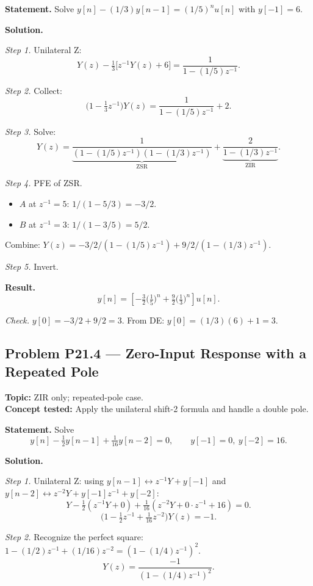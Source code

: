\documentclass[11pt]{article}
\begin{document}
\textbf{Statement.} Solve $y[n]-(1/3)y[n-1] = (1/5)^{n}u[n]$ with $y[-1]=6$.

\textbf{Solution.}

\textit{Step 1.} Unilateral Z:
\[
Y(z) - \tfrac{1}{3}\bigl[z^{-1}Y(z)+6\bigr] = \frac{1}{1-(1/5)z^{-1}}.
\]

\textit{Step 2.} Collect:
\[
\bigl(1-\tfrac{1}{3}z^{-1}\bigr)Y(z) = \frac{1}{1-(1/5)z^{-1}} + 2.
\]

\textit{Step 3.} Solve:
\[
Y(z) = \underbrace{\frac{1}{(1-(1/5)z^{-1})(1-(1/3)z^{-1})}}_{\text{ZSR}}
+\underbrace{\frac{2}{1-(1/3)z^{-1}}}_{\text{ZIR}}.
\]

\textit{Step 4.} PFE of ZSR.
\begin{itemize}
\item $A$ at $z^{-1}=5$: $1/(1-5/3) = -3/2$.
\item $B$ at $z^{-1}=3$: $1/(1-3/5) = 5/2$.
\end{itemize}
Combine: $Y(z) = -3/2/(1-(1/5)z^{-1}) + 9/2/(1-(1/3)z^{-1})$.

\textit{Step 5.} Invert.

\textbf{Result.}
\[
\boxed{\,y[n] = \left[-\tfrac{3}{2}\bigl(\tfrac{1}{5}\bigr)^{n}+\tfrac{9}{2}\bigl(\tfrac{1}{3}\bigr)^{n}\right]u[n].\,}
\]

\textit{Check.} $y[0] = -3/2+9/2 = 3$. From DE: $y[0] = (1/3)(6)+1 = 3$. \checkmark

\subsection{Problem P21.4 --- Zero-Input Response with a Repeated Pole}
\textbf{Topic:} ZIR only; repeated-pole case.\\
\textbf{Concept tested:} Apply the unilateral shift-2 formula and handle a double pole.

\textbf{Statement.} Solve
\[
y[n]-\tfrac{1}{2}y[n-1]+\tfrac{1}{16}y[n-2] = 0,\qquad y[-1]=0,\ y[-2]=16.
\]

\textbf{Solution.}

\textit{Step 1.} Unilateral Z: using
$y[n-1]\leftrightarrow z^{-1}Y+y[-1]$ and
$y[n-2]\leftrightarrow z^{-2}Y+y[-1]z^{-1}+y[-2]$:
\[
Y-\tfrac{1}{2}(z^{-1}Y+0)+\tfrac{1}{16}(z^{-2}Y+0\cdot z^{-1}+16) = 0.
\]
\[
\bigl(1-\tfrac{1}{2}z^{-1}+\tfrac{1}{16}z^{-2}\bigr)Y(z) = -1.
\]

\textit{Step 2.} Recognize the perfect square:
$1-(1/2)z^{-1}+(1/16)z^{-2} = (1-(1/4)z^{-1})^{2}$.
\[
Y(z) = \frac{-1}{(1-(1/4)z^{-1})^{2}}.
\]
\end{document}
